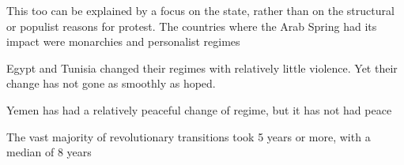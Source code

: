 This too can be explained by a focus on the state, rather than on the structural or populist reasons for protest. The countries where the Arab Spring had its impact were monarchies and personalist regimes

Egypt and Tunisia changed their regimes with relatively little violence. Yet their change has not gone as smoothly as hoped.

Yemen has had a relatively peaceful change of regime, but it has not had peace

The vast majority of revolutionary transitions took 5 years or more, with a median of 8 years




